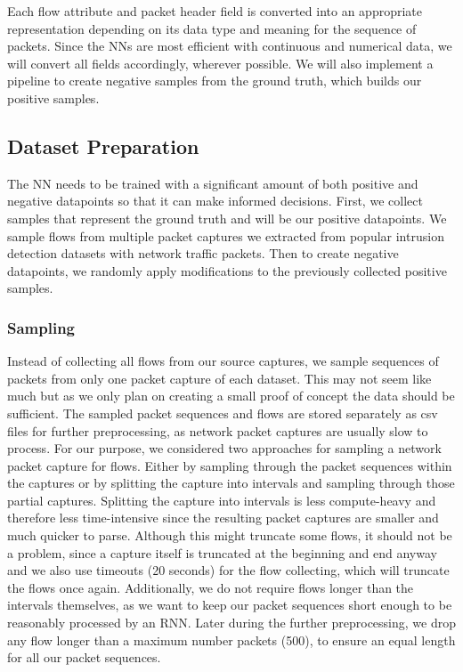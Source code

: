 \documentclass[
	ngerman,
	ruledheaders=section,%
	class=report,%
	thesis={type=bachelor},%
	accentcolor=9c,%
	custommargins=true,%
	marginpar=false,%
	parskip=half-,%
	fontsize=11pt,%
]{tudapub}
\begin{document}
Each flow attribute and packet header field is converted into an appropriate representation depending on its data type and meaning for the sequence of packets.
Since the NNs are most efficient with continuous and numerical data, we will convert all fields accordingly, wherever possible.
We will also implement a pipeline to create negative samples from the ground truth, which builds our positive samples.

\subsection{Dataset Preparation}
\label{sec:datasetPrep}

The NN needs to be trained with a significant amount of both positive and negative datapoints so that it can make informed decisions.
First, we collect samples that represent the ground truth and will be our positive datapoints.
We sample flows from multiple packet captures we extracted from popular intrusion detection datasets with network traffic packets.
Then to create negative datapoints, we randomly apply modifications to the previously collected positive samples.

\subsubsection{Sampling}
\label{sec:sampling}

Instead of collecting all flows from our source captures, we sample sequences of packets from only one packet capture of each dataset.
This may not seem like much but as we only plan on creating a small proof of concept the data should be sufficient.
The sampled packet sequences and flows are stored separately as csv files for further preprocessing, as network packet captures are usually slow to process.
For our purpose, we considered two approaches for sampling a network packet capture for flows.
Either by sampling through the packet sequences within the captures or by splitting the capture into intervals and sampling through those partial captures.
Splitting the capture into intervals is less compute-heavy and therefore less time-intensive since the resulting packet captures are smaller and much quicker to parse.
Although this might truncate some flows, it should not be a problem, since a capture itself is truncated at the beginning and end anyway
and we also use timeouts (20 seconds) for the flow collecting, which will truncate the flows once again.
Additionally, we do not require flows longer than the intervals themselves,
as we want to keep our packet sequences short enough to be reasonably processed by an RNN.
Later during the further preprocessing, we drop any flow longer than a maximum number packets (500), to ensure an equal length for all our packet sequences.
\end{document}
